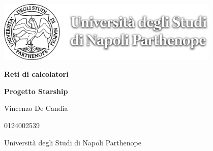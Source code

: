 \documentclass{article}
\begin{document}

\begin{center}
\vspace*{3\baselineskip}

\includegraphics[width=0.8\textwidth]{images/uniparthenope.png}\\
\vfill

{\huge \textbf{Reti di calcolatori}}

\vspace*{3\baselineskip}

{\LARGE \textbf{Progetto Starship}}

\begin{large}
\vspace*{2\baselineskip}

\vspace*{2\baselineskip}

{\Large Vincenzo De Candia \\ \par} %
{{ 0124002539}}\\[2cm] %


\vspace*{4\baselineskip}

{\large Università degli Studi di Napoli Parthenope}\par %

\thispagestyle{empty} 

\end{large}
\end{center}
\pagebreak



\tableofcontents
    \thispagestyle{nofooter}
    \cleardoublepage
    \typeout{}

\pagebreak
\end{document}
